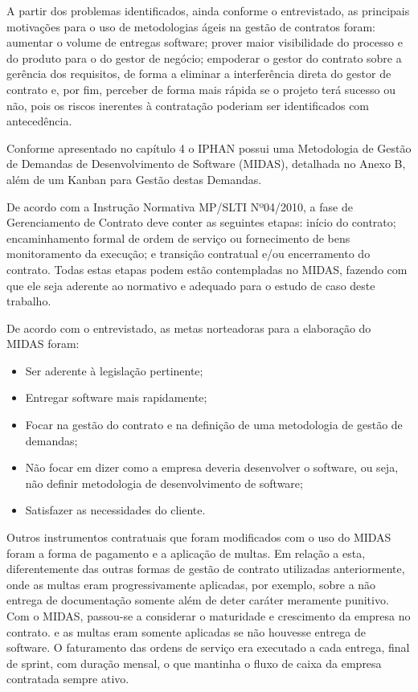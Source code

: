 A partir dos problemas identificados, ainda conforme o entrevistado, as principais motivações para o uso de metodologias ágeis na gestão de contratos foram: aumentar o volume de entregas software; prover maior visibilidade do processo e do produto para o do gestor de negócio; empoderar o gestor do contrato sobre a gerência dos requisitos, de forma a eliminar  a interferência direta do gestor de contrato e, por fim, perceber de forma mais rápida se o projeto terá sucesso ou não, pois os riscos inerentes à contratação poderiam ser identificados com antecedência.

Conforme apresentado no capítulo 4 o IPHAN possui uma Metodologia de Gestão de Demandas de Desenvolvimento de Software (MIDAS), detalhada no Anexo B, além de um Kanban para Gestão destas Demandas. 

De acordo com a Instrução Normativa MP/SLTI Nº04/2010, a fase de Gerenciamento de Contrato deve conter as seguintes etapas: início do contrato; encaminhamento formal de ordem de serviço ou fornecimento de bens  monitoramento da execução; e transição contratual e/ou encerramento do contrato. Todas estas etapas podem estão contempladas no MIDAS, fazendo com que ele seja aderente ao normativo e adequado para o estudo de caso deste trabalho.

De acordo com o entrevistado, as metas norteadoras para a elaboração do MIDAS foram:
\begin{itemize}
\item Ser aderente à legislação pertinente;
\item Entregar software mais rapidamente;
\item Focar na gestão do contrato e na definição de uma metodologia de gestão de demandas;
\item Não focar em dizer como a empresa deveria desenvolver o software, ou seja, não definir metodologia de desenvolvimento de software;
\item Satisfazer as necessidades do cliente.
\end{itemize}

Outros instrumentos contratuais que foram modificados com o uso do MIDAS foram a forma de pagamento e a aplicação de multas. Em relação a esta, diferentemente das outras formas de gestão de contrato utilizadas anteriormente, onde as multas eram progressivamente aplicadas, por exemplo, sobre a não entrega de documentação somente além de deter caráter meramente punitivo. Com o MIDAS, passou-se a considerar o maturidade e crescimento da empresa no contrato. e as multas eram somente aplicadas se não houvesse entrega de software. O faturamento das ordens de serviço era executado a cada entrega, final de sprint, com duração mensal, o que mantinha o fluxo de caixa da empresa contratada sempre ativo.

